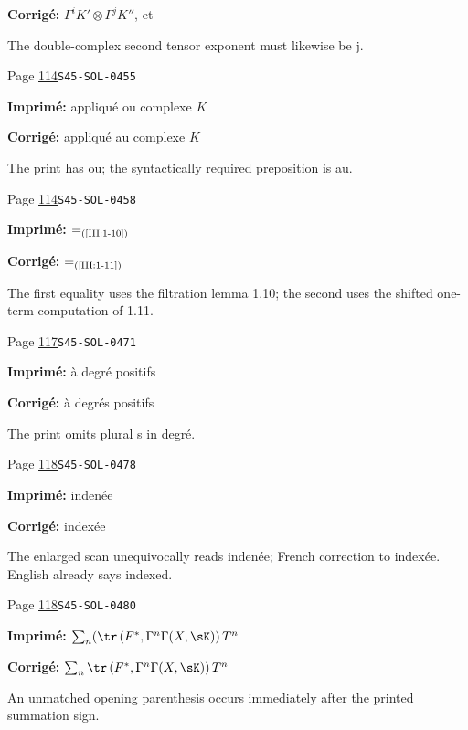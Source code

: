 \begin{description}
\par\noindent\textbf{Corrigé:} $\Gamma^i K'\otimes \Gamma^j K''$, et
\par\noindent The double-complex second tensor exponent must likewise be j.
\smallskip
\item[\hypertarget{apparatus:FR-0070}{70}] Page \hyperlink{printpage:fr:114}{114}\quad\texttt{S45-SOL-0455}
\par\noindent\textbf{Imprimé:} appliqué ou complexe $K$
\par\noindent\textbf{Corrigé:} appliqué au complexe $K$
\par\noindent The print has ou; the syntactically required preposition is au.
\smallskip
\item[\hypertarget{apparatus:FR-0071}{71}] Page \hyperlink{printpage:fr:114}{114}\quad\texttt{S45-SOL-0458}
\par\noindent\textbf{Imprimé:} \(=_{\text{(\ref{III:1-10})}}\)
\par\noindent\textbf{Corrigé:} \(=_{\text{(\ref{III:1-11})}}\)
\par\noindent The first equality uses the filtration lemma 1.10; the second uses the shifted one-term computation of 1.11.
\smallskip
\item[\hypertarget{apparatus:FR-0072}{72}] Page \hyperlink{printpage:fr:117}{117}\quad\texttt{S45-SOL-0471}
\par\noindent\textbf{Imprimé:} à degré positifs
\par\noindent\textbf{Corrigé:} à degrés positifs
\par\noindent The print omits plural s in degré.
\smallskip
\item[\hypertarget{apparatus:FR-0073}{73}] Page \hyperlink{printpage:fr:118}{118}\quad\texttt{S45-SOL-0478}
\par\noindent\textbf{Imprimé:} indenée
\par\noindent\textbf{Corrigé:} indexée
\par\noindent The enlarged scan unequivocally reads indenée; French correction to indexée. English already says indexed.
\smallskip
\item[\hypertarget{apparatus:FR-0074}{74}] Page \hyperlink{printpage:fr:118}{118}\quad\texttt{S45-SOL-0480}
\par\noindent\textbf{Imprimé:} \(\sum_n (\tr\left(F^*,\Gamma^n \Gamma(X,\sK)\right) T^n\)
\par\noindent\textbf{Corrigé:} \(\sum_n \tr\left(F^*,\Gamma^n \Gamma(X,\sK)\right) T^n\)
\par\noindent An unmatched opening parenthesis occurs immediately after the printed summation sign.

\end{description}
